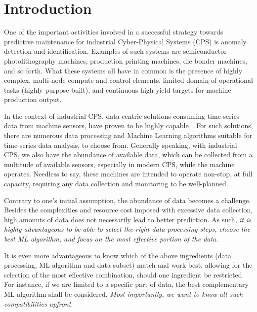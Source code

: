
\section{Introduction}
\label{sec:introduction}
One of the important activities involved in a successful strategy towards predictive maintenance for industrial Cyber-Physical Systems (CPS) is anomaly detection and identification. Examples of such systems are semiconductor photolithography machines, production printing machines, die bonder machines, and so forth. What these systems all have in common is the presence of highly complex, multi-node compute and control elements, limited domain of operational tasks (highly purpose-built), and continuous high yield targets for machine production output.

In the context of industrial CPS, data-centric solutions consuming time-series data from machine sensors, have proven to be highly capable~\cite{Odyurt:2022:IRIC}. For such solutions, there are numerous data processing and Machine Learning algorithms suitable for time-series data analysis, to choose from. Generally speaking, with industrial CPS, we also have the abundance of available data, which can be collected from a multitude of available sensors, especially in modern CPS, while the machine operates. Needless to say, these machines are intended to operate non-stop, at full capacity, requiring any data collection and monitoring to be well-planned.

Contrary to one's initial assumption, the abundance of data becomes a challenge. Besides the complexities and resource cost imposed with excessive data collection, high amounts of data does not necessarily lead to better prediction. As such, \emph{it is highly advantageous to be able to select the right data processing steps, choose the best ML algorithm, and focus on the most effective portion of the data}.

It is even more advantageous to know which of the above ingredients (data processing, ML algorithm and data subset) match and work best, allowing for the selection of the most effective combination, should one ingredient be restricted. For instance, if we are limited to a specific part of data, the best complementary ML algorithm shall be considered. \emph{Most importantly, we want to know all such compatibilities upfront}.

